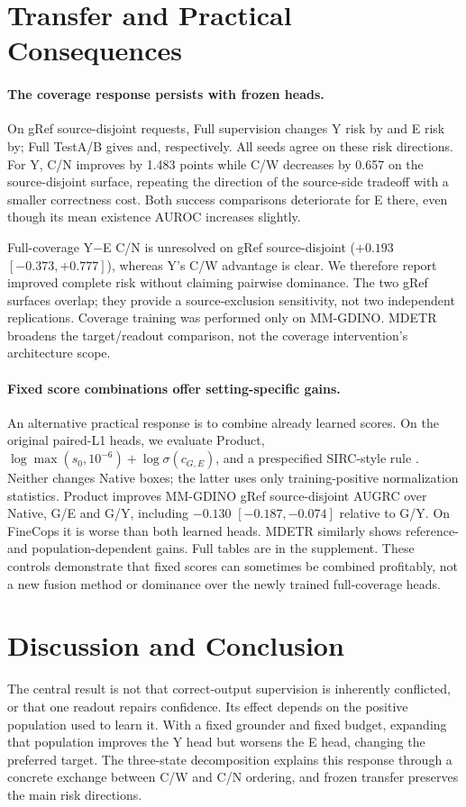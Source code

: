 \documentclass[10pt,twocolumn,letterpaper]{article}
\begin{document}
\section{Transfer and Practical Consequences}
\paragraph{The coverage response persists with frozen heads.}
On gRef source-disjoint requests, Full supervision changes Y risk by
\CovGRDY{} and E risk by\CovGRDE{}; Full TestA/B gives\CovFullDY{}
and\CovFullDE{}, respectively. All seeds agree on these risk directions.
For Y, C/N improves by 1.483 points while C/W decreases by 0.657 on the
source-disjoint surface, repeating the direction of the source-side tradeoff
with a smaller correctness cost. Both success comparisons deteriorate for E
there, even though its mean existence AUROC increases slightly.

Full-coverage Y$-$E C/N is unresolved on gRef source-disjoint
($+0.193$ $[-0.373,+0.777]$), whereas Y's C/W advantage is clear.
We therefore report improved complete risk without claiming pairwise
dominance. The two gRef surfaces overlap; they provide a source-exclusion
sensitivity, not two independent replications. Coverage training was
performed only on MM-GDINO. MDETR broadens the target/readout comparison,
not the coverage intervention's architecture scope.

\paragraph{Fixed score combinations offer setting-specific gains.}
An alternative practical response is to combine already learned scores.
On the original paired-L1 heads, we evaluate Product,
$\log\max(s_0,10^{-6})+\log\sigma(c_{G,E})$, and a prespecified SIRC-style
rule \cite{xia2024sirc}. Neither changes Native boxes; the latter uses
only training-positive normalization statistics. Product improves MM-GDINO
gRef source-disjoint AUGRC over Native, G/E and G/Y, including $-0.130$
$[-0.187,-0.074]$ relative to G/Y. On FineCops it is worse than both
learned heads. MDETR similarly shows reference- and population-dependent
gains. Full tables are in the supplement. These controls demonstrate that
fixed scores can sometimes be combined profitably, not a new fusion method
or dominance over the newly trained full-coverage heads.

\section{Discussion and Conclusion}
The central result is not that correct-output supervision is inherently
conflicted, or that one readout repairs confidence. Its effect depends on
the positive population used to learn it. With a fixed grounder and fixed
budget, expanding that population improves the Y head but worsens the E
head, changing the preferred target. The three-state decomposition explains
this response through a concrete exchange between C/W and C/N ordering,
and frozen transfer preserves the main risk directions.
\end{document}
